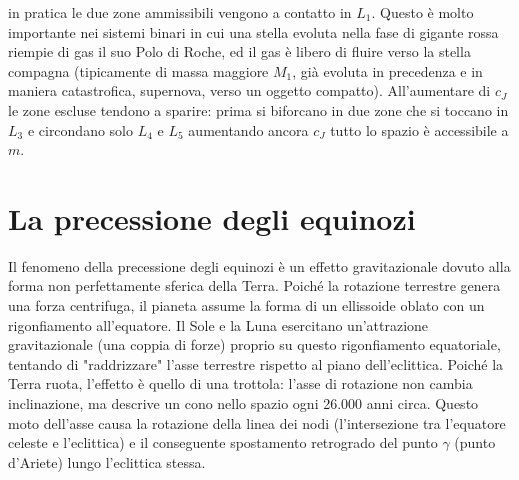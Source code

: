 \documentclass[a4paper, oneside]{book}
\begin{document}
in pratica le due zone ammissibili vengono a contatto in $L_1$.
Questo è molto importante nei sistemi binari in cui una stella evoluta nella fase 
di gigante rossa riempie di gas il suo Polo di Roche, 
ed il gas è libero di fluire verso la stella compagna (tipicamente di massa maggiore
$M_1$, già evoluta in precedenza e in maniera catastrofica, supernova, verso un oggetto compatto).
All'aumentare di $c_J$ le zone escluse tendono a sparire: prima si biforcano in due zone che si toccano in $L_3$
e circondano solo $L_4$ e $L_5$ aumentando ancora $c_J$ tutto lo spazio è accessibile a $m$.

\clearpage
\section{La precessione degli equinozi}
Il fenomeno della precessione degli equinozi è un effetto gravitazionale dovuto alla forma non perfettamente sferica della Terra.
Poiché la rotazione terrestre genera una forza centrifuga, il pianeta assume la forma di un ellissoide oblato con un rigonfiamento all'equatore.
Il Sole e la Luna esercitano un'attrazione gravitazionale (una coppia di forze) proprio su questo rigonfiamento equatoriale, tentando di
"raddrizzare" l'asse terrestre rispetto al piano dell'eclittica. Poiché la Terra ruota, l'effetto è quello di una trottola: l'asse di
rotazione non cambia inclinazione, ma descrive un cono nello spazio ogni 26.000 anni circa. Questo moto dell'asse causa la rotazione
della linea dei nodi (l'intersezione tra l'equatore celeste e l'eclittica) e il conseguente spostamento retrogrado del punto $\gamma$
(punto d'Ariete) lungo l'eclittica stessa.
\end{document}
